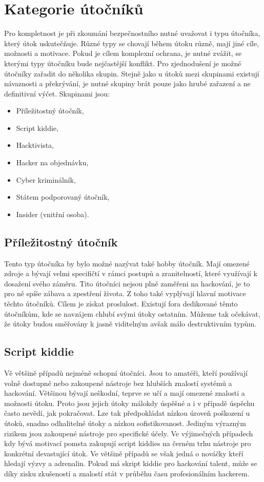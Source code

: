 \section{Kategorie útočníků}\label{sec:kategorie-utocniku}
Pro kompletnost je při zkoumání bezpečnostního nutné uvažovat i typu útočníka, který útok uskutečňuje.
Různé typy se chovají během útoku různě, mají jiné cíle, možnosti a motivace.
Pokud je cílem komplexní ochrana, je nutné zvážit, se kterými typy útočníku bude nejčastější konflikt.
Pro zjednodušení je možné útočníky zařadit do několika skupin.
Stejně jako u útoků mezi skupinami existují návaznosti a překrývání, je nutné skupiny brát pouze jako hrubé zařazení a ne definitivní výčet.
Skupinami jsou:
\begin{itemize}
	\item Příležitostný útočník,
	\item Script kiddie,
	\item Hacktivista,
	\item Hacker na objednávku,
	\item Cyber kriminálník,
	\item Státem podporovaný útočník,
	\item Insider (vnitřní osoba).
\end{itemize}\cite{Enisa_thread_landscape,data_flair_attackers}

\subsection{Příležitostný útočník}\label{subsec:prilezitostny-utocnik}
Tento typ útočníka by bylo možné nazývat také hobby útočník.
Mají omezené zdroje a bývají velmi specifičtí v rámci postupů a zranitelností, které využívají k dosažení svého záměru.
Tito útočníci nejsou plně zaměřeni na hackování, je to pro ně spíše zábava a zpestření života.
Z toho také vyplývají hlavní motivace těchto útočníků.
Cílem je získat proslulost.
Existují fora dedikované těmto útočníkům, kde se navzájem chlubí svými útoky ostatním.
Můžeme tak očekávat, že útoky budou směřovány k jasně viditelným avšak málo destruktivním typům.

\subsection{Script kiddie}\label{subsec:script-kiddie}
Vě většině případů nejméně schopní útočníci.
Jsou to amatéři, kteří používají volně dostupné nebo zakoupené nástroje bez hlubších znalostí systémů a hackování.
Většinou bývají neškodní, teprve se učí a mají omezené znalosti a možnosti útoku.
Proto jsou jejich útoky málokdy úspěšné a i v případě úspěchu často nevědí, jak pokračovat.
Lze tak předpokládat nízkou úroveň poškození u útoků, snadno odhalitelné útoky a nízkou sofistikovanost.
Jediným výrazným rizikem jsou zakoupené nástroje pro specifické účely.
Ve výjimečných případech kdy bývá motivací pomsta zakupují script kiddies na černém trhu nástroje pro konkrétní devastující útok.
Ve většině případů se však jedná o nováčky kteří hledají výzvy a adrenalin.
Pokud má skript kiddie pro hackování talent, může se díky zisku zkušeností a znalostí stát v průběhu času profesionálním hackerem.

